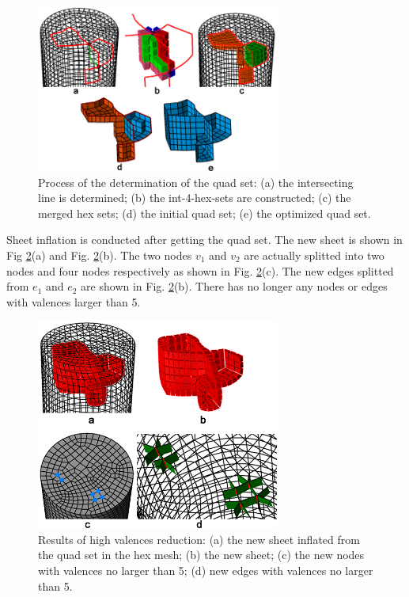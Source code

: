 \documentclass[final,5p,times,twocolumn]{elsarticle}
\begin{document}
\begin{figure}[htbp]
\begin{center}
\includegraphics[width=8cm]{exam2_quad_set.png}
\caption{Process of the determination of the quad set: (a) the intersecting line is determined; (b) the int-4-hex-sets are constructed; (c) the merged hex sets; (d) the initial quad set; (e) the optimized quad set.}
\label{fig:exam2_quad_set}
\end{center}
\end{figure}

Sheet inflation is conducted after getting the quad set. The new sheet is shown in Fig \ref{fig:exam2_sheet}(a) and Fig. \ref{fig:exam2_sheet}(b). The two nodes $v_1$ and $v_2$ are actually splitted into two nodes and four nodes respectively as shown in Fig. \ref{fig:exam2_sheet}(c). The new edges splitted from $e_1$ and $e_2$ are shown in Fig. \ref{fig:exam2_sheet}(b). There has no longer any nodes or edges with valences larger than 5.

\begin{figure}[htbp]
\begin{center}
\includegraphics[width=8cm]{exam2_sheet.png}
\caption{Results of high valences reduction: (a) the new sheet inflated from the quad set in the hex mesh; (b) the new sheet; (c) the new nodes with valences no larger than 5; (d) new edges with valences no larger than 5.}
\label{fig:exam2_sheet}
\end{center}
\end{figure}
\end{document}
